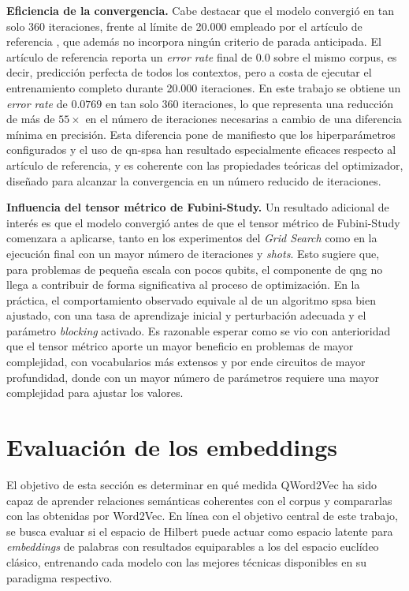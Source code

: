 \textbf{Eficiencia de la convergencia.} Cabe destacar que el modelo convergió en tan solo 360 iteraciones, frente al límite de 20.000 empleado por el artículo de referencia \cite{ohno_qword2vec_2025}, que además no incorpora ningún criterio de parada anticipada. El artículo de referencia reporta un \textit{error rate} final de $0.0$ sobre el mismo corpus, es decir, predicción perfecta de todos los contextos, pero a costa de ejecutar el entrenamiento completo durante 20.000 iteraciones. En este trabajo se obtiene un \textit{error rate} de $0.0769$ en tan solo 360 iteraciones, lo que representa una reducción de más de $55\times$ en el número de iteraciones necesarias a cambio de una diferencia mínima en precisión. Esta diferencia pone de manifiesto que los hiperparámetros configurados y el uso de \gls{qn-spsa} han resultado especialmente eficaces respecto al artículo de referencia, y es coherente con las propiedades teóricas del optimizador, diseñado para alcanzar la convergencia en un número reducido de iteraciones.

\textbf{Influencia del tensor métrico de Fubini-Study.} Un resultado adicional de interés es que el modelo convergió antes de que el tensor métrico de Fubini-Study comenzara a aplicarse, tanto en los experimentos del \textit{Grid Search} como en la ejecución final con un mayor número de iteraciones y \textit{shots}. Esto sugiere que, para problemas de pequeña escala con pocos qubits, el componente de \gls{qng} no llega a contribuir de forma significativa al proceso de optimización. En la práctica, el comportamiento observado equivale al de un algoritmo \gls{spsa} bien ajustado, con una tasa de aprendizaje inicial y perturbación adecuada y el parámetro \textit{blocking} activado. Es razonable esperar como se vio con anterioridad que el tensor métrico aporte un mayor beneficio en problemas de mayor complejidad, con vocabularios más extensos y por ende circuitos de mayor profundidad, donde con un mayor número de parámetros requiere una mayor complejidad para ajustar los valores.


\section{Evaluación de los embeddings}

El objetivo de esta sección es determinar en qué medida QWord2Vec ha sido capaz de aprender relaciones semánticas coherentes con el corpus y compararlas con las obtenidas por Word2Vec. En línea con el objetivo central de este trabajo, se busca evaluar si el espacio de Hilbert puede actuar como espacio latente para \textit{embeddings} de palabras con resultados equiparables a los del espacio euclídeo clásico, entrenando cada modelo con las mejores técnicas disponibles en su paradigma respectivo.

